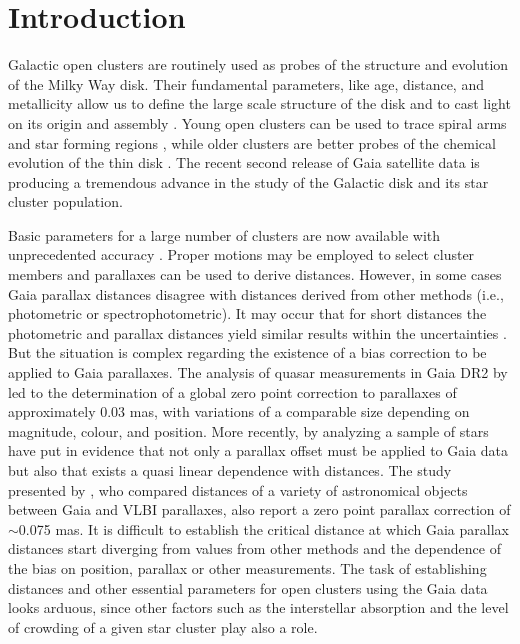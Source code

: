 \documentclass[draft]{aa}
\begin{document}

\maketitle




\section{Introduction}

Galactic open clusters are routinely used as probes of the structure and
evolution of the Milky Way disk. Their fundamental parameters, like age,
distance, and metallicity allow us to define the large scale structure of the
disk and to cast light on its origin and assembly \citep{Janes_1982,
Moitinho_2010,2018A&A...618A..93C}. Young open clusters can be used to trace
spiral arms and star forming regions \citep{Moitinho_2006,Vazquez2008}, while
older clusters are better probes of the chemical evolution of the thin disk
\citep{2009yCat..35120063M}. The recent second release of Gaia satellite data
\citep{GaiaDR2_2018} is producing a tremendous advance in the study of the
Galactic disk and its star cluster population.

Basic parameters for a large number of clusters are now available with
unprecedented accuracy \citep{2018A&A...618A..93C,Soubiran_2018,Bossini_2019,
Monteiro_2019}. Proper motions may be employed to select cluster members and
parallaxes can be used to derive distances. However, in some cases Gaia
parallax distances disagree with distances derived from other methods 
(i.e., photometric or spectrophotometric). It may occur that for
short distances the photometric and parallax distances yield similar results
within the uncertainties \citep{2018A&A...618A..93C}. But the situation is
complex regarding the existence of a bias correction to be applied to
Gaia parallaxes. The analysis of quasar measurements in Gaia DR2 by
\cite{Lindegren_2018} led to the determination of a global zero point
correction to parallaxes of approximately 0.03 mas, with variations of a
comparable size depending on magnitude, colour, and position.
More recently, by analyzing a sample of stars \cite{Schonrich2019} have put in
evidence that not only a parallax offset must be applied to Gaia data but also
that exists a quasi linear dependence with distances. The study presented by 
\cite{Xu_2019}, who compared distances of a variety of astronomical objects
between Gaia and VLBI parallaxes, also report a zero point parallax correction
of $\sim$0.075 mas.
It is difficult to establish the critical distance at which Gaia parallax
distances start diverging from values from other methods and the dependence of
the bias on position, parallax or other measurements. The  task of
establishing distances and other essential parameters for open clusters using
the Gaia data looks arduous, since other factors such as the interstellar
absorption and the level of crowding of a given star cluster play also a
role.
\end{document}

